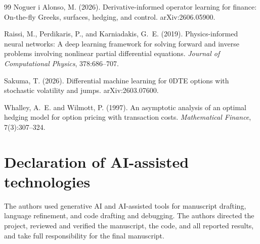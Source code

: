 \documentclass{article}
\begin{document}
\begin{thebibliography}{99}
Noguer i Alonso, M. (2026).
\newblock Derivative-informed operator learning for finance: On-the-fly Greeks,
surfaces, hedging, and control.
\newblock arXiv:2606.05900.

Raissi, M., Perdikaris, P., and Karniadakis, G.~E. (2019).
\newblock Physics-informed neural networks: A deep learning framework for solving
forward and inverse problems involving nonlinear partial differential equations.
\newblock \emph{Journal of Computational Physics}, 378:686--707.

Sakuma, T. (2026).
\newblock Differential machine learning for 0DTE options with stochastic
volatility and jumps.
\newblock arXiv:2603.07600.

Whalley, A.~E. and Wilmott, P. (1997).
\newblock An asymptotic analysis of an optimal hedging model for option pricing
with transaction costs.
\newblock \emph{Mathematical Finance}, 7(3):307--324.

\end{thebibliography}


\section*{Declaration of AI-assisted technologies}
The authors used generative AI and AI-assisted tools for manuscript drafting,
language refinement, and code drafting and debugging. The authors directed the
project, reviewed and verified the manuscript, the code, and all reported results,
and take full responsibility for the final manuscript.
\end{document}
